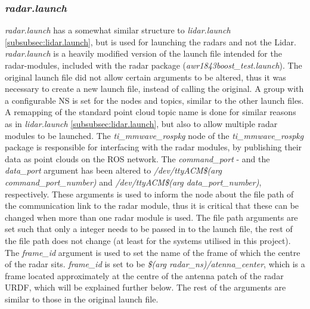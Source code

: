 \subsubsection{\textit{radar.launch}}
\textit{radar.launch} has a somewhat similar structure to \textit{lidar.launch} \ref{subsubsec:lidar.launch}, but is used for launching the radars and not the Lidar. \textit{radar.launch} is a heavily modified version of the launch file intended for the radar-modules, included with the radar package (\textit{awr1843boost\_test.launch}). The original launch file did not allow certain arguments to be altered, thus it was necessary to create a new launch file, instead of calling the original. A group with a configurable NS is set for the nodes and topics, similar to the other launch files. A remapping of the standard point cloud topic name is done for similar reasons as in \textit{lidar.launch} \ref{subsubsec:lidar.launch}, but also to allow multiple radar modules to be launched. The \textit{ti\_mmwave\_rospkg} node of the \textit{ti\_mmwave\_rospkg} package is responsible for interfacing with the radar modules, by publishing their data as point clouds on the ROS network. The \textit{command\_port} - and the \textit{data\_port} argument has been altered to \textit{/dev/ttyACM\$(arg command\_port\_number)} and \textit{/dev/ttyACM\$(arg data\_port\_number)}, respectively. These arguments is used to inform the node about the file path of the communication link to the radar module, thus it is critical that these can be changed when more than one radar module is used. The file path arguments are set such that only a integer needs to be passed in to the launch file, the rest of the file path does not change (at least for the systems utilised in this project). The \textit{frame\_id} argument is used to set the name of the frame of which the centre of the radar sits. \textit{frame\_id} is set to be \textit{\$(arg radar\_ns)/atenna\_center}, which is a frame located approximately at the centre of the antenna patch of the radar URDF, which will be explained further below. The rest of the arguments are similar to those in the original launch file. 

